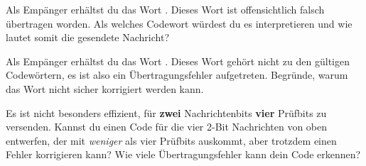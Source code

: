 \documentclass[10pt, a4paper]{arbeitsblatt}
\begin{document}
\begin{aufgabe}
	Als Empänger erhältst du das Wort . Dieses Wort ist
	offensichtlich falsch übertragen worden. Als welches Codewort würdest du es
	interpretieren und wie lautet somit die gesendete Nachricht?
\end{aufgabe}

\begin{aufgabe}
	Als Empänger erhältst du das Wort . Dieses Wort gehört
	nicht zu den gültigen Codewörtern, es ist also ein Übertragungsfehler
	aufgetreten. Begründe, warum das Wort nicht sicher korrigiert werden kann.
\end{aufgabe}

\begin{aufgabe*}
	Es ist nicht besonders effizient, für \textbf{zwei} Nachrichtenbits
	\textbf{vier} Prüfbits zu versenden. Kannst du einen Code für die vier
	2-Bit Nachrichten von oben  entwerfen, der mit \emph{weniger} als vier
	Prüfbits auskommt, aber trotzdem einen Fehler korrigieren kann? Wie viele
	Übertragungsfehler kann dein Code erkennen?
\end{aufgabe*}
\end{document}

